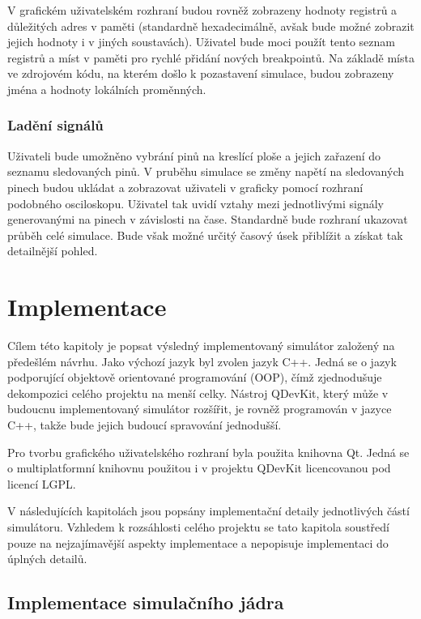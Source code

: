 V grafickém uživatelském rozhraní budou rovněž zobrazeny hodnoty registrů a důležitých adres v paměti (standardně hexadecimálně, avšak bude možné zobrazit jejich hodnoty i v jiných soustavách). Uživatel bude moci použít tento seznam registrů a míst v paměti pro rychlé přidání nových breakpointů. Na základě místa ve zdrojovém kódu, na kterém došlo k pozastavení simulace, budou zobrazeny jména a hodnoty lokálních proměnných.

\subsection{Ladění signálů}

Uživateli bude umožněno vybrání pinů na kreslící ploše a jejich zařazení do seznamu sledovaných pinů. V pruběhu simulace se změny napětí na sledovaných pinech budou ukládat a zobrazovat uživateli v graficky pomocí rozhraní podobného osciloskopu. Uživatel tak uvidí vztahy mezi jednotlivými signály generovanými na pinech v závislosti na čase. Standardně bude rozhraní ukazovat průběh celé simulace. Bude však možné určitý časový úsek přiblížit a získat tak detailnější pohled.

\chapter{Implementace}

Cílem této kapitoly je popsat výsledný implementovaný simulátor založený na předešlém návrhu. Jako výchozí jazyk byl zvolen jazyk C++. Jedná se o jazyk podporující objektově orientované programování (OOP), čímž zjednodušuje dekompozici celého projektu na menší celky. Nástroj QDevKit, který může v budoucnu implementovaný simulátor rozšířit, je rovněž programován v jazyce C++, takže bude jejich budoucí spravování jednodušší.

Pro tvorbu grafického uživatelského rozhraní byla použita knihovna Qt. Jedná se o multiplatformní knihovnu použitou i v projektu QDevKit licencovanou pod licencí LGPL.

V následujících kapitolách jsou popsány implementační detaily jednotlivých částí simulátoru. Vzhledem k rozsáhlosti celého projektu se tato kapitola soustředí pouze na nejzajímavější aspekty implementace a nepopisuje implementaci do úplných detailů.

\section{Implementace simulačního jádra}

